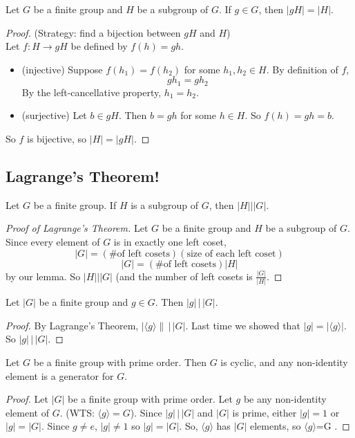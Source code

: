 \begin{lemma}
Let $G$ be a finite group and $H$ be a subgroup of $G$. If $g\in G$, then $|gH|=|H|$.
\end{lemma}

\begin{proof}
(Strategy: find a bijection between $gH$ and $H$)\\
Let $f:H\rightarrow gH$ be defined by $f(h)=gh$. 
\begin{itemize}
    \item (injective) Suppose $f(h_1)=f(h_2)$ for some $h_1,h_2\in H$. By definition of $f$, 
    \[gh_1=gh_2\]
    By the left-cancellative property, $h_1=h_2$.
    \item (surjective) Let $b\in gH$. Then $b=gh$ for some $h\in H$. So $f(h)=gh=b$.
\end{itemize}
So $f$ is bijective, so $|H|=|gH|$.
\end{proof}

\subsection{Lagrange's Theorem!}

\begin{theorem}[Lagrange]
Let $G$ be a finite group. If $H$ is a subgroup of $G$, then $|H| \big| |G|$.
\end{theorem}

\begin{proof}[Proof of Lagrange's Theorem]
Let $G$ be a finite group and $H$ be a subgroup of $G$. Since every element of $G$ is in exactly one left coset, 
\[|G| = (\mbox{\# of left cosets})(\mbox{size of each left coset})\]
\[|G| = (\mbox{\# of left cosets})|H|\]
by our lemma. So $|H|\big| |G|$ (and the number of left cosets is $\frac{|G|}{|H|}$.
\end{proof}

\begin{corollary}
Let $|G|$ be a finite group and $g\in G$. Then $|g|\,\big|\,|G|$.
\end{corollary}
\begin{proof}
By Lagrange's Theorem, $|\langle g \rangle\| \,\big| \,|G|$. Last time we showed that $|g| = |\langle g\rangle|$. So $|g| \,\big| \,|G|$.
\end{proof}

\begin{corollary}
Let $G$ be a finite group with prime order. Then $G$ is cyclic, and any non-identity element is a generator for $G$.
\end{corollary}

\begin{proof}
Let $|G|$ be a finite group with prime order. Let $g$ be any non-identity element of $G$. (WTS: $\langle g \rangle =G $). Since $|g| \,\big| \,|G|$ and $|G|$ is prime, either $|g|=1$ or $|g|=|G|$. Since $g\neq e$, $|g|\neq 1$ so $|g|=|G|$. So, $\langle g \rangle$ has $|G|$ elements, so $\langle g \rangle $=G .
\end{proof}